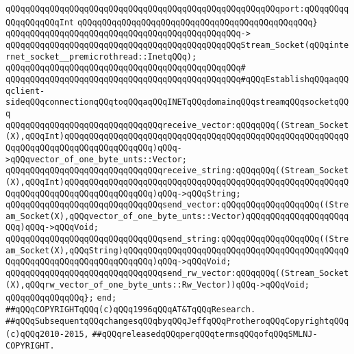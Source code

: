 \verb|qQQqqQQqqQQqqQQqqQQqqQQqqQQqqQQqqQQqqQQqqQQqqQQqqQQqqQQqport:qQQqqQQqqQQqqQQqqQQqInt|\newline
\verb|qQQqqQQqqQQqqQQqqQQqqQQqqQQqqQQqqQQqqQQqqQQqqQQq}|\newline
\verb|qQQqqQQqqQQqqQQqqQQqqQQqqQQqqQQqqQQqqQQqqQQqqQQq->|\newline
\verb|qQQqqQQqqQQqqQQqqQQqqQQqqQQqqQQqqQQqqQQqqQQqqQQqStream_Socket(qQQqinternet_socket__premicrothread::InetqQQq);|\newline
\verb|qQQqqQQqqQQqqQQqqQQqqQQqqQQqqQQqqQQqqQQqqQQqqQQq#|\newline
\verb|qQQqqQQqqQQqqQQqqQQqqQQqqQQqqQQqqQQqqQQqqQQqqQQq#qQQqEstablishqQQqaqQQqclient-sideqQQqconnectionqQQqtoqQQqaqQQqINETqQQqdomainqQQqstreamqQQqsocketqQQq|\newline
\newline
\verb|qQQqqQQqqQQqqQQqqQQqqQQqqQQqqQQqreceive_vector:qQQqqQQq((Stream_Socket(X),qQQqInt)qQQqqQQqqQQqqQQqqQQqqQQqqQQqqQQqqQQqqQQqqQQqqQQqqQQqqQQqqQQqqQQqqQQqqQQqqQQqqQQqqQQqqQQq)qQQq->qQQqvector_of_one_byte_unts::Vector;|\newline
\verb|qQQqqQQqqQQqqQQqqQQqqQQqqQQqqQQqreceive_string:qQQqqQQq((Stream_Socket(X),qQQqInt)qQQqqQQqqQQqqQQqqQQqqQQqqQQqqQQqqQQqqQQqqQQqqQQqqQQqqQQqqQQqqQQqqQQqqQQqqQQqqQQqqQQqqQQq)qQQq->qQQqString;|\newline
\newline
\verb|qQQqqQQqqQQqqQQqqQQqqQQqqQQqqQQqsend_vector:qQQqqQQqqQQqqQQqqQQq((Stream_Socket(X),qQQqvector_of_one_byte_unts::Vector)qQQqqQQqqQQqqQQqqQQqqQQq)qQQq->qQQqVoid;|\newline
\verb|qQQqqQQqqQQqqQQqqQQqqQQqqQQqqQQqsend_string:qQQqqQQqqQQqqQQqqQQq((Stream_Socket(X),qQQqString)qQQqqQQqqQQqqQQqqQQqqQQqqQQqqQQqqQQqqQQqqQQqqQQqqQQqqQQqqQQqqQQqqQQqqQQqqQQq)qQQq->qQQqVoid;|\newline
\verb|qQQqqQQqqQQqqQQqqQQqqQQqqQQqqQQqsend_rw_vector:qQQqqQQq((Stream_Socket(X),qQQqrw_vector_of_one_byte_unts::Rw_Vector))qQQq->qQQqVoid;|\newline
\verb|qQQqqQQqqQQqqQQq};|\newline
\verb|end;|\newline
\newline
\verb|##qQQqCOPYRIGHTqQQq(c)qQQq1996qQQqAT&TqQQqResearch.|\newline
\verb|##qQQqSubsequentqQQqchangesqQQqbyqQQqJeffqQQqProtheroqQQqCopyrightqQQq(c)qQQq2010-2015,|\newline
\verb|##qQQqreleasedqQQqperqQQqtermsqQQqofqQQqSMLNJ-COPYRIGHT.|\newline

